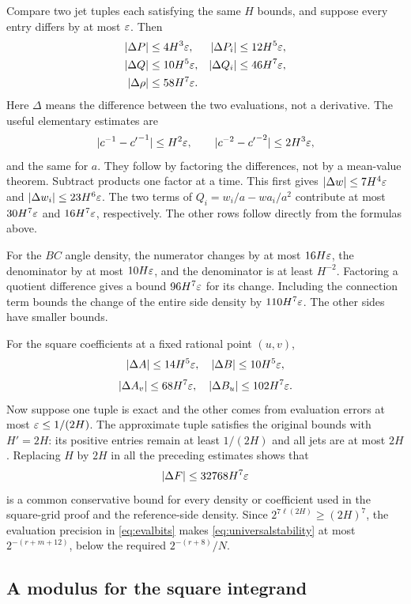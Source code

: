 Compare two jet tuples each satisfying the same $H$ bounds, and suppose every entry differs by at most $\varepsilon$. Then
\begin{equation}\label{eq:stabilityconstants}
\begin{aligned}
|\Delta P|&\le4H^3\varepsilon,&
|\Delta P_i|&\le12H^5\varepsilon,\\
|\Delta Q|&\le10H^5\varepsilon,&
|\Delta Q_i|&\le46H^7\varepsilon,\\
|\Delta\rho|&\le58H^7\varepsilon.
\end{aligned}
\end{equation}
Here $\Delta$ means the difference between the two evaluations, not a derivative. The useful elementary estimates are
\[
|c^{-1}-{c'}^{-1}|\le H^2\varepsilon,
\qquad |c^{-2}-{c'}^{-2}|\le2H^3\varepsilon,
\]
and the same for $a$. They follow by factoring the differences, not by a mean-value theorem. Subtract products one factor at a time. This first gives
$|\Delta w|\le7H^4\varepsilon$ and
$|\Delta w_i|\le23H^6\varepsilon$.
The two terms of $Q_i=w_i/a-wa_i/a^2$ contribute at most
$30H^7\varepsilon$ and $16H^7\varepsilon$, respectively. The other rows follow directly from the formulas above.

For the $BC$ angle density, the numerator changes by at most $16H\varepsilon$, the denominator by at most $10H\varepsilon$, and the denominator is at least $H^{-2}$. Factoring a quotient difference gives a bound $96H^7\varepsilon$ for its change. Including the connection term bounds the change of the entire side density by $110H^7\varepsilon$. The other sides have smaller bounds.

For the square coefficients at a fixed rational point $(u,v)$,
\[
|\Delta A|\le14H^5\varepsilon,\quad |\Delta B|\le10H^5\varepsilon,
\]
\[
|\Delta A_v|\le68H^7\varepsilon,\quad
|\Delta B_u|\le102H^7\varepsilon.
\]
Now suppose one tuple is exact and the other comes from evaluation errors at most $\varepsilon\le1/(2H)$. The approximate tuple satisfies the original bounds with $H'=2H$: its positive entries remain at least $1/(2H)$ and all jets are at most $2H$. Replacing $H$ by $2H$ in all the preceding estimates shows that
\begin{equation}\label{eq:universalstability}
|\Delta F|\le32768H^7\varepsilon
\end{equation}
is a common conservative bound for every density or coefficient used in the square-grid proof and the reference-side density. Since
$2^{7\ell(2H)}\ge(2H)^7$, the evaluation precision in \eqref{eq:evalbits} makes \eqref{eq:universalstability} at most
$2^{-(r+m+12)}$, below the required $2^{-(r+8)}/N$.

\subsection{A modulus for the square integrand}

